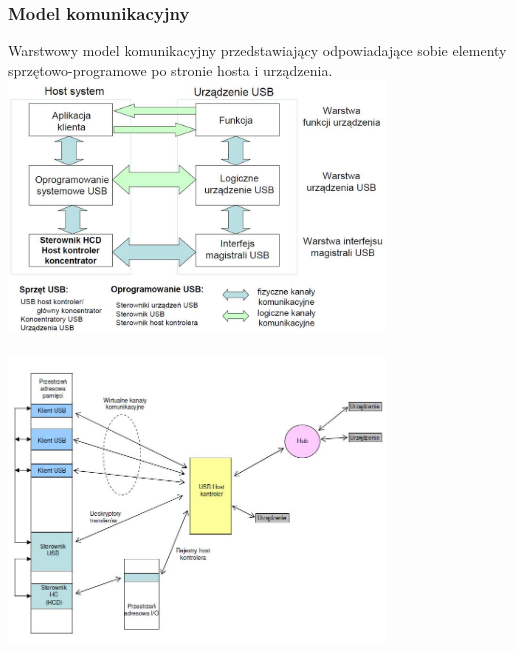 		\subsubsection{Model komunikacyjny}
		Warstwowy model komunikacyjny przedstawiający odpowiadające sobie elementy sprzętowo-programowe po stronie hosta i urządzenia.\\
		\includegraphics[width=10cm]{./wyklady/USB_12_1.jpg}\\\\
		\includegraphics[width=10cm]{./wyklady/USB_13_1.jpg}\\
		\newpage
